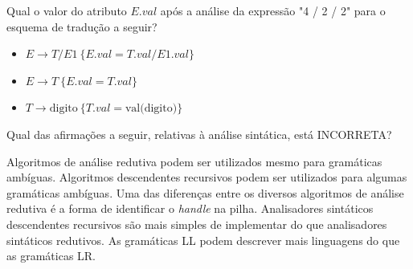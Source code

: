 \documentclass[12pt, addpoints]{exam}
\begin{document}
\begin{questions}
\question
Qual o valor do atributo \( E.val \) após a análise da expressão "4 / 2 / 2" para o esquema de tradução a seguir?

\begin{itemize}
    \item \( E \rightarrow T / E1 \ \{ E.val = T.val / E1.val \} \)
    \item \( E \rightarrow T \ \{ E.val = T.val \} \)
    \item \( T \rightarrow \text{digito} \ \{ T.val = \text{val(digito)} \} \)
\end{itemize}

\begin{choices}
\end{choices}

\question
Qual das afirmações a seguir, relativas à análise sintática, está INCORRETA?

\begin{choices}
\choice Algoritmos de análise redutiva podem ser utilizados mesmo para gramáticas ambíguas.
\choice Algoritmos descendentes recursivos podem ser utilizados para algumas gramáticas ambíguas.
\choice Uma das diferenças entre os diversos algoritmos de análise redutiva é a forma de identificar o \textit{handle} na pilha.
\choice Analisadores sintáticos descendentes recursivos são mais simples de implementar do que analisadores sintáticos redutivos.
\choice As gramáticas LL podem descrever mais linguagens do que as gramáticas LR.
\end{choices}



    \end{questions}
    
\end{document}
